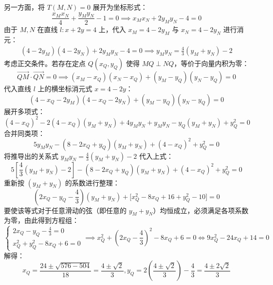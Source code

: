\begin{solution}
另一方面，将 $T(M,N) = 0$ 展开为坐标形式：
$$ \frac{x_M x_N}{4} + \frac{y_M y_N}{2} - 1 = 0 \implies x_M x_N + 2y_M y_N - 4 = 0 $$
由于 $M, N$ 在直线 $l: x + 2y = 4$ 上，代入 $x_M = 4 - 2y_M$ 与 $x_N = 4 - 2y_N$ 进行消元：
\begin{align*}
(4 - 2y_M)(4 - 2y_N) + 2y_M y_N - 4 = 0 \implies y_M y_N = \frac{4}{3}(y_M + y_N) - 2
\end{align*}
考虑正交条件。若存在定点 $Q(x_Q, y_Q)$ 使得 $MQ \perp NQ$，等价于向量内积为零：
$$ \overrightarrow{QM} \cdot \overrightarrow{QN} = 0 \implies (x_M - x_Q)(x_N - x_Q) + (y_M - y_Q)(y_N - y_Q) = 0 $$
代入直线 $l$ 上的横坐标消元式 $x = 4 - 2y$：
$$ (4 - x_Q - 2y_M)(4 - x_Q - 2y_N) + (y_M - y_Q)(y_N - y_Q) = 0 $$
展开多项式：
$$ (4 - x_Q)^2 - 2(4 - x_Q)(y_M + y_N) + 4y_M y_N + y_M y_N - y_Q(y_M + y_N) + y_Q^2 = 0 $$
合并同类项：
$$ 5y_M y_N - (8 - 2x_Q + y_Q)(y_M + y_N) + (4 - x_Q)^2 + y_Q^2 = 0 $$
将推导出的关系式 $y_M y_N = \frac{4}{3}(y_M + y_N) - 2$ 代入上式：
$$ 5\left[ \frac{4}{3}(y_M + y_N) - 2 \right] - (8 - 2x_Q + y_Q)(y_M + y_N) + (4 - x_Q)^2 + y_Q^2 = 0 $$
重新按 $(y_M + y_N)$ 的系数进行整理：
$$ \left( 2x_Q - y_Q - \frac{4}{3} \right)(y_M + y_N) + \big[ x_Q^2 - 8x_Q + 16 + y_Q^2 - 10 \big] = 0 $$
要使该等式对于任意滑动的弦（即任意的 $y_M + y_N$）均恒成立，必须满足各项系数为零，由此得到方程组：
$$
\begin{cases}
2x_Q - y_Q - \frac{4}{3} = 0 \\
x_Q^2 + y_Q^2 - 8x_Q + 6 = 0
\end{cases}\implies x_Q^2 + \left( 2x_Q - \frac{4}{3} \right)^2 - 8x_Q + 6 = 0 \Leftrightarrow 9x_Q^2 - 24x_Q + 14 = 0
$$
解得：
$$ x_Q = \frac{24 \pm \sqrt{576 - 504}}{18} =  \frac{4 \pm \sqrt{2}}{3} , y_Q = 2\left( \frac{4 \pm \sqrt{2}}{3} \right) - \frac{4}{3} = \frac{4 \pm 2\sqrt{2}}{3} $$
\end{solution}

